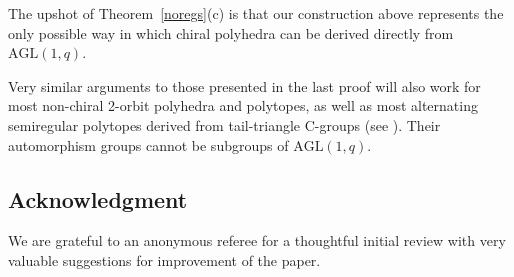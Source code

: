 \documentclass[12pt]{article}
\theoremstyle{definition}\newtheorem{definition}{Definition}[section]
\begin{document}
The upshot of Theorem~\ref{noregs}(c) is that our construction above represents the only possible way in which chiral polyhedra can be derived directly from $\mathrm{AGL}(1,q)$.
\smallskip

Very similar arguments to those presented in the last proof will also work for most non-chiral 2-orbit polyhedra and polytopes, as well as most alternating semiregular polytopes derived from tail-triangle C-groups (see \cite{Hub2010,MonSch2012}). Their automorphism groups cannot be subgroups of $\mathrm{AGL}(1,q)$.

\subsection*{Acknowledgment}
We are grateful to an anonymous referee for a thoughtful initial review with very valuable suggestions for improvement of the paper.
\end{document}
